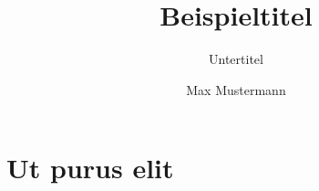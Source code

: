 \documentclass[a4paper,11pt]{tubsreprt}
\title{Beispieltitel}
\subtitle{Untertitel}
\author{Max Mustermann}
\begin{document}
\maketitle[image]%
\makebackpage[plain]%

\chapter{Ut purus elit}

\lipsum[2-4]
\end{document}
